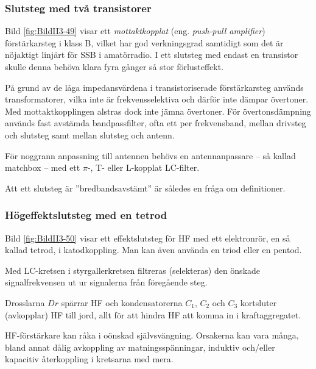 \subsubsection{Slutsteg med två transistorer}


Bild \ref{fig:BildII3-49} visar ett \emph{mottaktkopplat} (eng.
\emph{push-pull amplifier}) förstärkarsteg i klass B, vilket har god verkningsgrad
samtidigt som det är nöjaktigt linjärt för SSB i amatörradio.
I ett slutsteg med endast en transistor skulle denna behöva klara fyra gånger
så stor förlusteffekt.

På grund av de låga impedansvärdena i transistoriserade förstärkarsteg används
transformatorer, vilka inte är frekvensselektiva och därför inte dämpar
övertoner.
Med mottaktkopplingen alstras dock inte jämna övertoner.
För övertonsdämpning används fast avstämda bandpassfilter, ofta ett per
frekvensband, mellan drivsteg och slutsteg samt mellan slutsteg och antenn.

För noggrann anpassning till antennen behövs en antennanpassare --
så kallad matchbox -- med ett \(\pi \)-, T- eller L-kopplat LC-filter.

Att ett slutsteg är ''bredbandsavstämt'' är således en fråga om definitioner.

\subsubsection{Högeffektslutsteg med en tetrod}


Bild \ref{fig:BildII3-50} visar ett effektslutsteg för HF med ett elektronrör,
en så kallad tetrod, i katodkoppling.
Man kan även använda en triod eller en pentod.

Med LC-kretsen i styrgallerkretsen filtreras (selekteras) den önskade
signalfrekvensen ut ur signalerna från föregående steg.

Drosslarna \(Dr\) spärrar HF och kondensatorerna \(C_1\), \(C_2\) och
\(C_3\) kortsluter (avkopplar) HF till jord,
allt för att hindra HF att komma in i kraftaggregatet.

HF-förstärkare kan råka i oönskad självsvängning.
Orsakerna kan vara många, bland annat dålig avkoppling av matningsspänningar,
induktiv och/eller kapacitiv återkoppling i kretsarna med mera.

